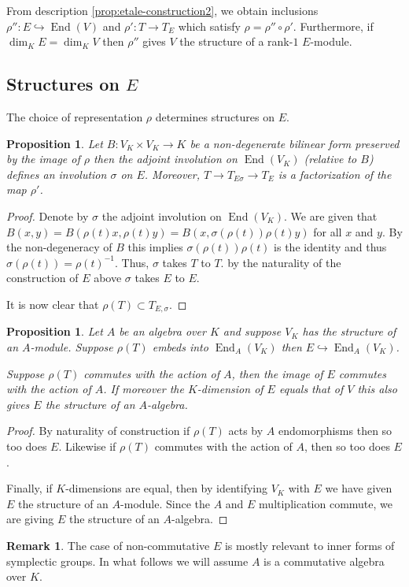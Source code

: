 \documentclass{article}
\theoremstyle{plain}
\newtheorem{proposition}[theorem]{Proposition}
\theoremstyle{definition}
\newtheorem{remark}[theorem]{Remark}
\DeclareMathOperator{\End}{End}
\begin{document}
From description \eqref{prop:etale-construction2}, we obtain inclusions $\rho'' : E \hookrightarrow \End(V)$ and $\rho' : T \rightarrow T_E$ which satisfy $\rho = \rho''\circ\rho'$.  Furthermore, if $\dim_K E = \dim_K V$ then $\rho''$ gives $V$ the structure of a rank-$1$ $E$-module.

\subsection{Structures on $E$}

The choice of representation $\rho$ determines structures on $E$.

\begin{proposition}
Let $B : V_K \times V_K \rightarrow K$ be a non-degenerate bilinear form preserved by the image of $\rho$ then the adjoint involution on $\End(V_K)$ (relative to $B$) defines an involution $\sigma$ on $E$.
Moreover, $T \rightarrow T_{E\sigma} \rightarrow T_E$ is a factorization of the map $\rho'$.
\end{proposition}
\begin{proof}
Denote by $\sigma$ the adjoint involution on $\End(V_K)$.
We are given that $B(x,y) = B(\rho(t)x,\rho(t)y) = B(x,\sigma(\rho(t))\rho(t)y)$ for all $x$ and $y$. By the non-degeneracy of $B$ this implies $\sigma(\rho(t))\rho(t)$ is the identity and thus $\sigma(\rho(t)) = \rho(t)^{-1}$. Thus, $\sigma$ takes $T$ to $T$. by the naturality of the construction of $E$ above $\sigma$ takes $E$ to $E$.

It is now clear that $\rho(T) \subset T_{E,\sigma}$.
\end{proof}



\begin{proposition}
Let $A$ be an algebra over $K$ and suppose $V_K$ has the structure of an $A$-module.
Suppose $\rho(T)$ embeds into $\End_A(V_K)$ then $E\hookrightarrow \End_A(V_K)$.

Suppose $\rho(T)$ commutes with the action of $A$, then the image of $E$ commutes with the action of $A$.
If moreover the $K$-dimension of $E$ equals that of $V$ this also gives $E$ the structure of an $A$-algebra.
\end{proposition}
\begin{proof}
By naturality of construction if $\rho(T)$ acts by $A$ endomorphisms then so too does $E$.
Likewise if $\rho(T)$ commutes with the action of $A$, then so too does $E$.

Finally, if $K$-dimensions are equal, then by identifying $V_K$ with $E$ we have given $E$ the structure of an $A$-module. Since the $A$ and $E$ multiplication commute, we are giving $E$ the structure of an $A$-algebra.
\end{proof}
\begin{remark}
The case of non-commutative $E$ is mostly relevant to inner forms of symplectic groups.
In what follows we will assume $A$ is a commutative algebra over $K$.
\end{remark}
\end{document}
